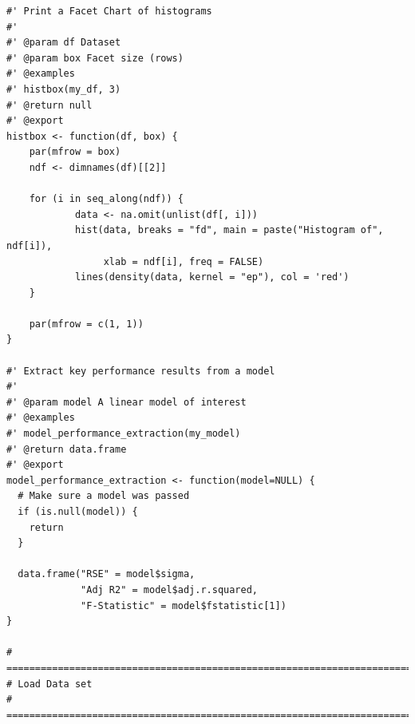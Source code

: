 \documentclass[
]{article}
\begin{document}
\begin{verbatim}
#' Print a Facet Chart of histograms
#'
#' @param df Dataset
#' @param box Facet size (rows)
#' @examples
#' histbox(my_df, 3)
#' @return null
#' @export
histbox <- function(df, box) {
    par(mfrow = box)
    ndf <- dimnames(df)[[2]]
    
    for (i in seq_along(ndf)) {
            data <- na.omit(unlist(df[, i]))
            hist(data, breaks = "fd", main = paste("Histogram of", ndf[i]),
                 xlab = ndf[i], freq = FALSE)
            lines(density(data, kernel = "ep"), col = 'red')
    }
    
    par(mfrow = c(1, 1))
}

#' Extract key performance results from a model
#'
#' @param model A linear model of interest
#' @examples
#' model_performance_extraction(my_model)
#' @return data.frame
#' @export
model_performance_extraction <- function(model=NULL) {
  # Make sure a model was passed
  if (is.null(model)) {
    return
  }
  
  data.frame("RSE" = model$sigma,
             "Adj R2" = model$adj.r.squared,
             "F-Statistic" = model$fstatistic[1])
}

# =====================================================================================
# Load Data set
# =====================================================================================

\end{verbatim}
\end{document}
